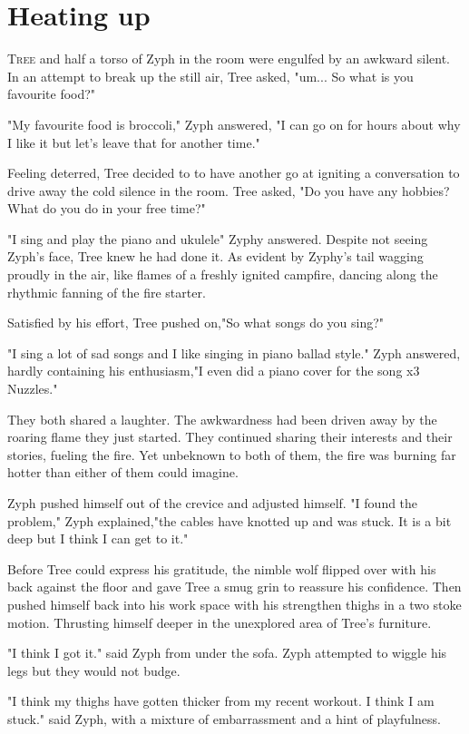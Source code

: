 \chapter{Heating up}

\lettrine{T}{ree} and half a torso of Zyph in the room were engulfed by an awkward silent. In an attempt to break up the still air, Tree asked, "um... So what is you favourite food?"

"My favourite food is broccoli," Zyph answered, "I can go on for hours about why I like it but let's leave that for another time."

Feeling deterred, Tree decided to to have another go at igniting a conversation to drive away the cold silence in the room. Tree asked, "Do you have any hobbies? What do you do in your free time?"

"I sing and play the piano and ukulele" Zyphy answered. Despite not seeing Zyph's face, Tree knew he had done it. As evident by Zyphy's tail wagging proudly in the air, like flames of a freshly ignited campfire, dancing along the rhythmic fanning of the fire starter.

Satisfied by his effort, Tree pushed on,"So what songs do you sing?"

"I sing a lot of sad songs and I like singing in piano ballad style." Zyph answered, hardly containing his enthusiasm,"I even did a piano cover for the song x3 Nuzzles."

They both shared a laughter. The awkwardness had been driven away by the roaring flame they just started. They continued sharing their interests and their stories, fueling the fire. Yet unbeknown to both of them, the fire was burning far hotter than either of them could imagine.

Zyph pushed himself out of the crevice and adjusted himself. "I found the problem," Zyph explained,"the cables have knotted up and was stuck. It is a bit deep but I think I can get to it."

Before Tree could express his gratitude, the nimble wolf flipped over with his back against the floor and gave Tree a smug grin to reassure his confidence. Then pushed himself back into his work space with his strengthen thighs in a two stoke motion. Thrusting himself deeper in the unexplored area of Tree's furniture.

"I think I got it." said Zyph from under the sofa. Zyph attempted to wiggle his legs but they would not budge.

"I think my thighs have gotten thicker from my recent workout. I think I am stuck." said Zyph, with a mixture of embarrassment and a hint of playfulness.

